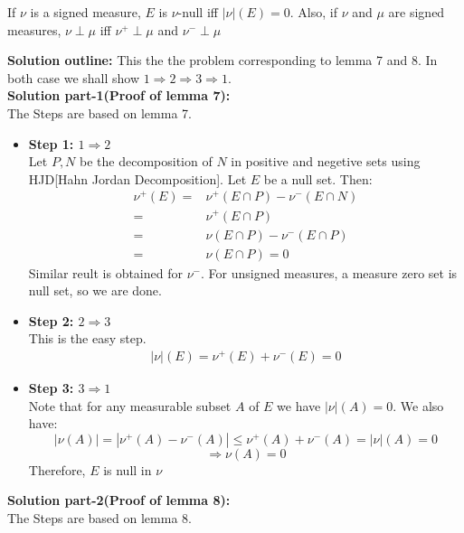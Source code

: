 \documentclass[notoc]{tufte-book}
\begin{document}
\begin{tcolorbox}[colback=c4,colframe=c3,title=Problem 3.2]
	If $\nu$ is a signed measure, $E$ is $\nu$-null iff  $|\nu|(E)=0$. Also, if $\nu$ and $\mu$ are signed 
measures, $\nu\perp\mu$ iff  $\nu^+\perp\mu$ and $\nu^-\perp\mu$
\end{tcolorbox}\noindent
\textbf{Solution outline:} This the the problem corresponding to lemma 7 and 8. In both case we shall show
$1\Rightarrow2\Rightarrow3\Rightarrow1$.\\
\textbf{Solution part-1(Proof of lemma 7): }\\
The Steps are based on lemma 7.
\begin{itemize}
	\item \textbf{Step 1: $1\Rightarrow 2$}\\
		Let $P,N$ be the decomposition of $N$ in positive and negetive sets using HJD[Hahn Jordan Decomposition].  Let $E$ be a null set. Then:
		\begin{align*}
			\nu^+(E)=&\nu^+(E\cap P)-\nu^-(E\cap N)\\
			=&\nu^+(E\cap P)\\
			=&\nu(E\cap P)-\nu^-(E\cap P)\\
			=&\nu(E\cap P)=0
		\end{align*}
		Similar reult is obtained for $\nu^-$. For unsigned measures, a measure zero set is null set, so we are done.
	\item \textbf{Step 2: $2\Rightarrow 3$}\\
	This is the easy step.
	\begin{align*}
		|\nu|(E)=\nu^+(E)+\nu^-(E)=0
	\end{align*}
	\item \textbf{Step 3: $3\Rightarrow 1$}\\
	Note that for any measurable subset $A$ of $E$ we have $|\nu|(A)=0$. We also have:
	$$|\nu(A)|=|\nu^+(A)-\nu^-(A)|\leq \nu^+(A)+\nu^-(A)=|\nu|(A)=0$$
	$$\Rightarrow \nu(A)=0$$
	Therefore, $E$ is null in $\nu$
\end{itemize}
\textbf{Solution part-2(Proof of lemma 8): }\\
The Steps are based on lemma 8.
\end{document}
